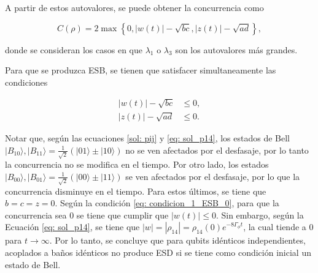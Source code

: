 A partir de estos autovalores, se puede obtener la concurrencia como

\begin{equation}    \label{eq: concurrencia_two_qubits}
    C(\rho) = 2 \max \left\{0, |w(t)| - \sqrt{bc}, |z(t)| - \sqrt{ad}\right\},
\end{equation}

\noindent donde se consideran los casos en que \(\lambda_1\) o \(\lambda_3\) son los autovalores más grandes.

Para que se produzca ESB, se tienen que satisfacer simultaneamente las condiciones \cite{ESB}

\begin{align}
    |w(t)| - \sqrt{bc} &\leq 0, \label{eq: condicion_1_ESB_0} \\
    |z(t)| - \sqrt{ad} &\leq 0. \label{eq: condicion_2_ESB_0}
\end{align}

Notar que, según las ecuaciones \ref{sol: pij} y \ref{eq: sol_p14}, los estados de Bell \(|B_{10}\rangle, |B_{11}\rangle = \frac{1}{\sqrt{2}} (|01\rangle \pm |10\rangle)\) no se ven afectados por el desfasaje, por lo tanto la concurrencia no se modifica en el tiempo. Por otro lado, los estados \(|B_{00}\rangle, |B_{01}\rangle = \frac{1}{\sqrt{2}} (|00\rangle \pm |11\rangle)\) se ven afectados por el desfasaje, por lo que la concurrencia disminuye en el tiempo. Para estos últimos, se tiene que \(b = c = z = 0\). Según la condición \ref{eq: condicion_1_ESB_0}, para que la concurrencia sea 0 se tiene que cumplir que \(|w(t)| \leq 0\). Sin embargo, según la Ecuación \ref{eq: sol_p14}, se tiene que \(|w| = |\rho_{14}| = \rho_{14}(0) e^{-8 \Gamma_\phi t}\), la cual tiende a 0 para \(t \rightarrow \infty\). Por lo tanto, se concluye que para qubits idénticos independientes, acoplados a baños idénticos no produce ESD si se tiene como condición inicial un estado de Bell.




